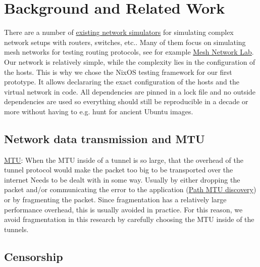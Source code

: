 
\chapter{Background and Related Work}
\label{chap:background}


There are a number of \href{https://brianlinkletter.com/2023/02/network-emulators-and-network-simulators-2023/}{existing network simulators} for simulating complex network setups with routers, switches, etc..
Many of them focus on simulating mesh networks for testing routing protocols, see for example \href{https://github.com/mwarning/meshnet-lab}{Mesh Network Lab}.
Our network is relatively simple, while the complexity lies in the configuration of the hosts.
This is why we chose the NixOS testing framework for our first prototype.
It allows declararing the exact configuration of the hosts and the virtual network in code.
All dependencies are pinned in a lock file and no outside dependencies are used so everything should still be reproducible in a decade or more without having to e.g. hunt for ancient Ubuntu images.

\section{Network data transmission and MTU}
\href{https://en.wikipedia.org/wiki/Maximum_transmission_unit}{MTU}:
When the MTU inside of a tunnel is so large, that the overhead of the tunnel protocol would make the packet too big to be transported over the internet
Needs to be dealt with in some way. Usually by either dropping the packet and/or communicating the error to the application (\href{https://en.wikipedia.org/wiki/Path_MTU_Discovery}{Path MTU discovery}) or by fragmenting the packet. Since fragmentation has a relatively large performance overhead, this is usually avoided in practice. For this reason, we avoid fragmentation in this research by carefully choosing the MTU inside of the tunnels.

\section{Censorship}

